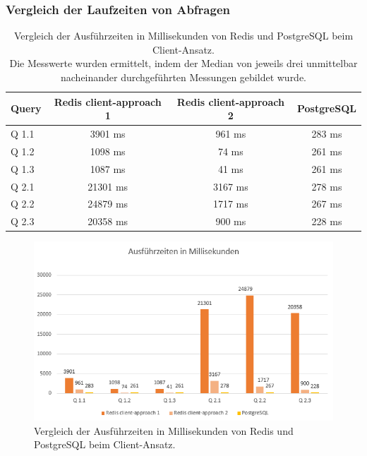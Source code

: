 \subsubsection{Vergleich der Laufzeiten von Abfragen}
\begin{table}[h]
\centering
\begin{tabular}{lccc}
\hline
Query & Redis client-approach 1 & Redis client-approach 2 & PostgreSQL \\ \hline
Q 1.1 & 3901 ms & 961 ms & 283 ms       \\
Q 1.2 & 1098 ms & 74 ms & 261 ms       \\
Q 1.3 & 1087 ms & 41 ms & 261 ms       \\
Q 2.1 & 21301 ms & 3167 ms & 278 ms       \\
Q 2.2 & 24879 ms & 1717 ms & 267 ms       \\
Q 2.3 & 20358 ms & 900 ms & 228 ms       \\\hline
\end{tabular}
\caption{Vergleich der Ausführzeiten in Millisekunden von Redis und PostgreSQL beim Client-Ansatz.\\
 Die Messwerte wurden ermittelt, indem der Median von jeweils drei unmittelbar nacheinander durchgeführten Messungen gebildet wurde.}
\label{tab:results-client}
\end{table}
\begin{figure}[ht]  %
    \centering      %
    \includegraphics[width=1\textwidth]{pictures/results/results-client.png}
    \caption{Vergleich der Ausführzeiten in Millisekunden von Redis und PostgreSQL beim Client-Ansatz.}      %
    \label{pic:results-client}    %
\end{figure}

